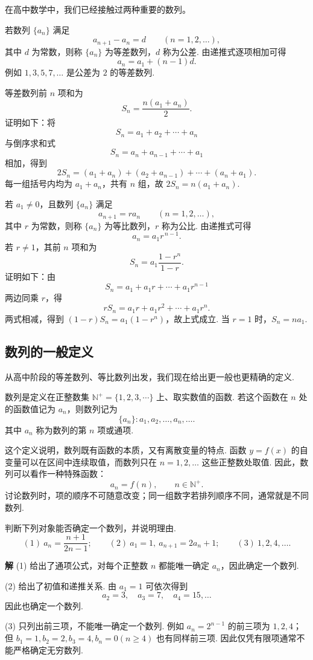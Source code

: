 \documentclass[fontset=fandol]{ctexart}
\newenvironment{custom}[1]{\par\noindent\textbf{#1}\quad}{\par\vspace{0.8em}}
\begin{document}
在高中数学中，我们已经接触过两种重要的数列。

\begin{example}[等差数列]
若数列 $\{a_n\}$ 满足
\[
a_{n+1}-a_n=d\qquad(n=1,2,\ldots),
\]
其中 $d$ 为常数，则称 $\{a_n\}$ 为等差数列，$d$ 称为公差. 由递推式逐项相加可得
\[
a_n=a_1+(n-1)d.
\]
例如 $1,3,5,7,\ldots$ 是公差为 $2$ 的等差数列.

等差数列前 $n$ 项和为
\[
S_n=\frac{n(a_1+a_n)}{2}.
\]
证明如下：将
\[
S_n=a_1+a_2+\cdots+a_n
\]
与倒序求和式
\[
S_n=a_n+a_{n-1}+\cdots+a_1
\]
相加，得到
\[
2S_n=(a_1+a_n)+(a_2+a_{n-1})+\cdots+(a_n+a_1).
\]
每一组括号内均为 $a_1+a_n$，共有 $n$ 组，故 $2S_n=n(a_1+a_n)$.
\end{example}

\begin{example}[等比数列]
若 $a_1\ne0$，且数列 $\{a_n\}$ 满足
\[
a_{n+1}=ra_n\qquad(n=1,2,\ldots),
\]
其中 $r$ 为常数，则称 $\{a_n\}$ 为等比数列，$r$ 称为公比. 由递推式可得
\[
a_n=a_1r^{\,n-1}.
\]
若 $r\ne1$，其前 $n$ 项和为
\[
S_n=a_1\frac{1-r^n}{1-r}.
\]
证明如下：由
\[
S_n=a_1+a_1r+\cdots+a_1r^{n-1}
\]
两边同乘 $r$，得
\[
rS_n=a_1r+a_1r^2+\cdots+a_1r^n.
\]
两式相减，得到 $(1-r)S_n=a_1(1-r^n)$，故上式成立. 当 $r=1$ 时，$S_n=na_1$.
\end{example}

\subsection{数列的一般定义}

从高中阶段的等差数列、等比数列出发，我们现在给出更一般也更精确的定义.

\begin{definition}[数列]
数列是定义在正整数集 $\mathbb{N}^+=\{1,2,3,\cdots\}$ 上、取实数值的函数. 若这个函数在 $n$ 处的函数值记为 $a_n$，则数列记为
\[
\{a_n\}:a_1,a_2,\ldots,a_n,\ldots .
\]
其中 $a_n$ 称为数列的第 $n$ 项或通项.
\end{definition}

这个定义说明，数列既有函数的本质，又有离散变量的特点. 函数 $y=f(x)$ 的自变量可以在区间中连续取值，而数列只在 $n=1,2,\ldots$ 这些正整数处取值. 因此，数列可以看作一种特殊函数：
\[
a_n=f(n),\qquad n\in\mathbb{N}^+.
\]
讨论数列时，项的顺序不可随意改变；同一组数字若排列顺序不同，通常就是不同数列.

\begin{example}
判断下列对象能否确定一个数列，并说明理由.
\[
(1)\ a_n=\frac{n+1}{2n-1};\qquad
(2)\ a_1=1,\ a_{n+1}=2a_n+1;\qquad
(3)\ 1,2,4,\ldots .
\]
\end{example}
\begin{custom}{解}
(1) 给出了通项公式，对每个正整数 $n$ 都能唯一确定 $a_n$，因此确定一个数列.

(2) 给出了初值和递推关系. 由 $a_1=1$ 可依次得到
\[
a_2=3,\quad a_3=7,\quad a_4=15,\ldots
\]
因此也确定一个数列.

(3) 只列出前三项，不能唯一确定一个数列. 例如 $a_n=2^{n-1}$ 的前三项为 $1,2,4$；但 $b_1=1,b_2=2,b_3=4,b_n=0(n\ge4)$ 也有同样前三项. 因此仅凭有限项通常不能严格确定无穷数列.
\end{custom}
\end{document}

